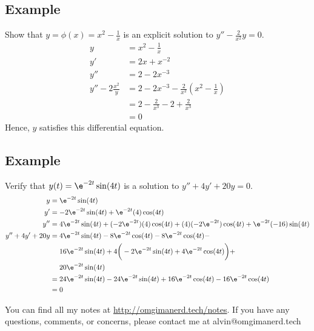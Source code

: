 \documentclass{math}
\begin{document}
\subsection*{Example}
Show that \( y = \phi(x) = x^2-\frac{1}{x} \) is an explicit solution to
\( y''-\frac{2}{x^2}y = 0 \).
\begin{align*}
  y &= x^2-\frac{1}{x} \\
  y' &= 2x+x^{-2} \\
  y'' &= 2-2x^{-3} \\
  y''-2\frac{x^2}y &= 2-2x^{-3}-\frac{2}{x^2}(x^2-\frac{1}{x}) \\
  &= 2-\frac{2}{x^3}-2+\frac{2}{x^3} \\
  &= 0
\end{align*}
Hence, \( y \) satisfies this differential equation.

\subsection*{Example}
Verify that \( y(t)=\e^{-2t}\sin(4t) \) is a solution to \( y''+4y'+20y = 0 \).
\begin{align*}
  y &= \e^{-2t}\sin(4t) \\
  y' &= -2\e^{-2t}\sin(4t)+\e^{-2t}(4)\cos(4t) \\
  y'' &= 4\e^{-2t}\sin(4t)+(-2\e^{-2t})(4)\cos(4t)+(4)(-2\e^{-2t})\cos(4t)+
    \e^{-2t}(-16)\sin(4t) \\
  y''+4y'+20y &= 4\e^{-2t}\sin(4t)-8\e^{-2t}\cos(4t)-8\e^{-2t}\cos(4t)- \\
    &~~~~ 16\e^{-2t}\sin(4t)+
      4\bigg(-2\e^{-2t}\sin(4t)+4\e^{-2t}\cos(4t)\bigg)+ \\
    &~~~~ 20\e^{-2t}\sin(4t) \\
  &= 24\e^{-2t}\sin(4t)-24\e^{-2t}\sin(4t)+
    16\e^{-2t}\cos(4t)-16\e^{-2t}\cos(4t) \\
  &= 0
\end{align*}

\begin{center}
  You can find all my notes at \url{http://omgimanerd.tech/notes}. If you have
  any questions, comments, or concerns, please contact me at
  alvin@omgimanerd.tech
\end{center}
\end{document}
